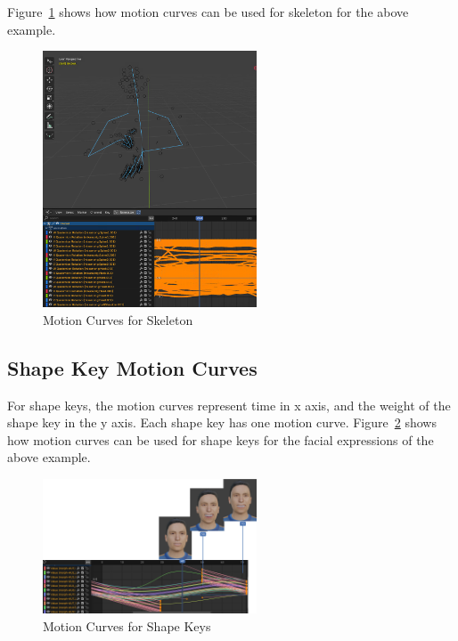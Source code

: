 \documentclass[../../main.tex]{subfiles}
\begin{document}
Figure~\ref{fig:motion_curves_skeletal} shows how motion curves can be used for skeleton for the above example.

\begin{figure}
    \centering \includegraphics[width = 2.5in]{chapters/intermediate_blocks/images/motion_curves_skeletal.png}
    \caption{Motion Curves for Skeleton}
    \label{fig:motion_curves_skeletal}
\end{figure}

\subsection{Shape Key Motion Curves}
\label{ch:intermediate_blocks_pose_correction:curves:shape_keys}

For shape keys, the motion curves represent time in x axis, and the weight of the shape key in the y axis. Each shape key has one motion curve. Figure~\ref{fig:motion_curves_shape_keys} shows how motion curves can be used for shape keys for the facial expressions of the above example.

\begin{figure}
    \centering \includegraphics[width = 2.5in]{chapters/intermediate_blocks/images/motion_curves_shape_keys.png}
    \caption{Motion Curves for Shape Keys}
    \label{fig:motion_curves_shape_keys}
\end{figure}
\end{document}
